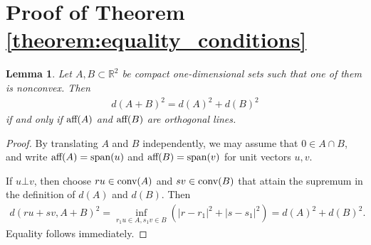 \documentclass[11pt]{article}
\newtheorem{lemma}{Lemma}[section]
\begin{document}
\section{Proof of Theorem \ref{theorem:equality_conditions}}

\begin{lemma}\label{lemma:one_dimensional_one_non_convex}
    Let $A,B\subset\mathbb{R}^2$ be compact one-dimensional sets such that one of them is nonconvex. Then
    \begin{align*}
        d(A+B)^2=d(A)^2+d(B)^2
    \end{align*}
    if and only if $\textup{aff}(A)$ and $\textup{aff}(B)$ are orthogonal lines. 
\end{lemma}

\begin{proof}
    By translating $A$ and $B$ independently, we may assume that $0\in A\cap B$, and write $\textup{aff}(A)=\textup{span}(u)$ and $\textup{aff}(B)=\textup{span}(v)$ for unit vectors $u,v$.

    If $u\bot v$, then choose $ru\in \textup{conv}(A)$ and $sv\in \textup{conv}(B)$ that attain the supremum in the definition of $d(A)$ and $d(B)$. Then
    \begin{align*}
        d(ru+sv,A+B)^2=\inf_{r_1u\in A,s_1v\in B}(|r-r_1|^2+|s-s_1|^2)=d(A)^2+d(B)^2.
    \end{align*}
    Equality follows immediately.


\end{proof}
\end{document}
